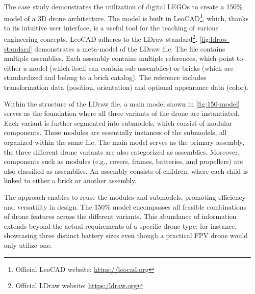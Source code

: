 \documentclass[sigconf,review]{acmart}
\begin{document}
The case study demonstrates the utilization of digital LEGOs to create a 150\% model of a 3D drone architecture. 
The model is built in LeoCAD\footnote{Official LeoCAD website: \url{https://leocad.org}}, which, thanks to its intuitive user interface, is a useful tool for the teaching of various engineering concepts. 
LeoCAD adheres to the LDraw standard\footnote{Official LDraw website: \url{https:/ldraw.org}}. 
\cref{fig:ldraw-standard} demonstrates a meta-model of the LDraw file. The file contains multiple assemblies. 
Each assembly contains multiple references, which point to either a model (which itself can contain sub-assemblies) or bricks (which are standardized and belong to a brick catalog). 
The reference includes transformation data (position, orientation) and optional appearance data (color).

Within the structure of the LDraw file, a main model shown in \cref{fig:150-model} serves as the foundation where all three variants of the drone are instantiated. 
Each variant is further segmented into submodels, which consist of modular components. 
These modules are essentially instances of the submodels, all organized within the same file.
The main model serves as the primary assembly, the three different drone variants are also categorized as assemblies. 
Moreover, components such as modules (e.g., covers, frames, batteries, and propellers) are also classified as assemblies. 
An assembly consists of children, where each child is linked to either a brick or another assembly. 


The approach enables to reuse the modules and submodels, promoting efficiency and versatility in design. 
The 150\% model encompasses all feasible combinations of drone features across the different variants. 
This abundance of information extends beyond the actual requirements of a specific drone type; for instance, showcasing three distinct battery sizes even though a practical FPV drone would only utilize one.

\end{document}

